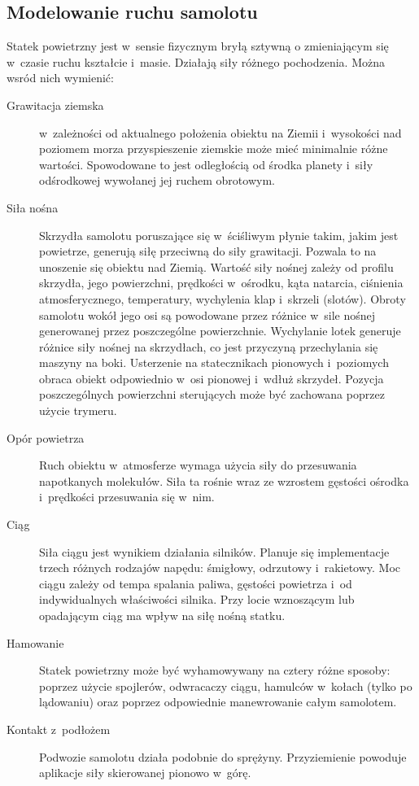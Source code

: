 \documentclass{mwrep}
\begin{document}
\subsection{Modelowanie ruchu samolotu}

Statek powietrzny jest w~sensie fizycznym bryłą sztywną o zmieniającym się w~czasie ruchu kształcie i~masie. Działają siły różnego pochodzenia. Można wsród nich wymienić:
\begin{description}
\item[Grawitacja ziemska] w~zależności od aktualnego położenia obiektu na Ziemii i~wysokości nad poziomem morza przyspieszenie ziemskie może mieć minimalnie różne wartości. Spowodowane to jest odległością od środka planety i~siły odśrodkowej wywołanej jej ruchem obrotowym.
\item[Siła nośna] Skrzydła samolotu poruszające się w~ściśliwym płynie takim, jakim jest powietrze, generują siłę przeciwną do siły grawitacji. Pozwala to na unoszenie się obiektu nad Ziemią. Wartość siły nośnej zależy od profilu skrzydła, jego powierzchni, prędkości w~ośrodku, kąta natarcia, ciśnienia atmosferycznego, temperatury, wychylenia klap i~skrzeli (slotów). Obroty samolotu wokół jego osi są powodowane przez różnice w~sile nośnej generowanej przez poszczególne powierzchnie. Wychylanie lotek generuje różnice siły nośnej na skrzydłach, co jest przyczyną przechylania się maszyny na boki. Usterzenie na statecznikach pionowych i~poziomych obraca obiekt odpowiednio w~osi pionowej i~wdłuż skrzydeł. Pozycja poszczególnych powierzchni sterujących może być zachowana poprzez użycie trymeru.
\item[Opór powietrza] Ruch obiektu w~atmosferze wymaga użycia siły do przesuwania napotkanych molekułów. Siła ta rośnie wraz ze wzrostem gęstości ośrodka i~prędkości przesuwania się w~nim.
\item[Ciąg] Siła ciągu jest wynikiem działania silników. Planuje się implementacje trzech różnych rodzajów napędu: śmigłowy, odrzutowy i~rakietowy. Moc ciągu zależy od tempa spalania paliwa, gęstości powietrza i~od indywidualnych właściwości silnika. Przy locie wznoszącym lub opadającym ciąg ma wpływ na siłę nośną statku.
\item[Hamowanie] Statek powietrzny może być wyhamowywany na cztery różne sposoby: poprzez użycie spojlerów, odwracaczy ciągu, hamulców w~kołach (tylko po lądowaniu) oraz poprzez odpowiednie manewrowanie całym samolotem.
\item[Kontakt z~podłożem] Podwozie samolotu działa podobnie do sprężyny. Przyziemienie powoduje aplikacje siły skierowanej pionowo w~górę.
\end{description}
\end{document}
